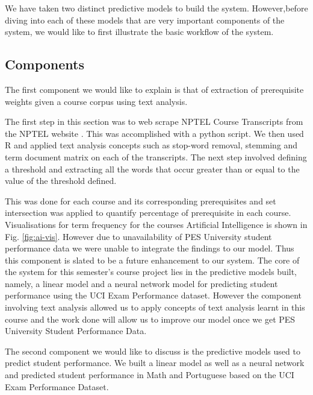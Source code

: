 \documentclass[conference]{IEEEtran}
\begin{document}
We have taken two distinct predictive models to build the system. However,before
diving into each of these models that are very important components of the system, we
would like to first illustrate the basic workflow of the system.

		\subsection{Components}
The first component we would like to explain is that of extraction of prerequisite
weights given a course corpus using text analysis.

The first step in this section was to web scrape NPTEL Course Transcripts from the
NPTEL website \cite{nptel}. This was accomplished with a python script. We then used R \cite{r} and applied 
text analysis concepts such as stop-word removal, stemming and term document matrix 
on each of the transcripts. The next step involved defining a threshold and extracting 
all the words that occur greater than or equal to the value of the threshold defined.

This was done for each course and its corresponding prerequisites and set intersection
was applied to quantify percentage of prerequisite in each course. Visualisations for
term frequency for the courses Artificial Intelligence is shown in Fig. \ref{fig:ai-vis}.
However due to unavailability of PES University student performance data we were
unable to integrate the findings to our model. Thus this component is slated to be a future
enhancement to our system. The core of the system for this semester’s course project
lies in the predictive models built, namely, a linear model and a neural network
model for predicting student performance using the UCI Exam Performance dataset.
However the component involving text analysis allowed us to apply concepts of text
analysis learnt in this course and the work done will allow us to improve our model once
we get PES University Student Performance Data.

The second component we would like to discuss is the predictive models used to predict
student performance. We built a linear model as well as a neural network and
predicted student performance in Math and Portuguese based on the UCI Exam
Performance Dataset\cite{Lichman:2013}\cite{ref:4}.
\end{document}
